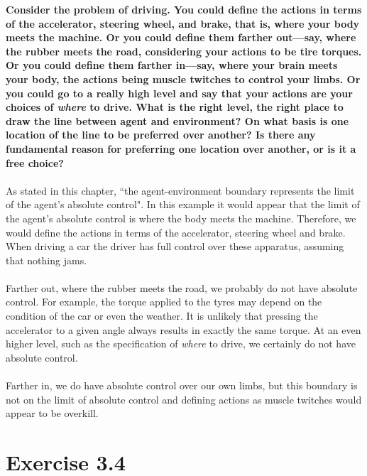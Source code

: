 \documentclass[a4paper,11pt]{article}
\numberwithin{equation}{section}
\theoremstyle{remark}
\begin{document}
\textbf{Consider the problem of driving. You could define the actions in terms of the accelerator, steering wheel, and brake, that is, where your body meets the machine. Or you could define them farther out—say, where the rubber meets the road, considering your actions to be tire torques. Or you could define them farther in—say, where your brain meets your body, the actions being muscle twitches to control your limbs. Or you could go to a really high level and say that your actions are your choices of \emph{where} to drive. What is the right level, the right place to draw the line between agent and environment? On what basis is one location of the line to be preferred over another? Is there any fundamental reason for preferring one location over another, or is it a free choice?}
\\ \\
As stated in this chapter, ``the agent-environment boundary represents the limit of the agent's absolute control". In this example it would appear that the limit of the agent's absolute control is where the body meets the machine. Therefore, we would define the actions in terms of the accelerator, steering wheel and brake. When driving a car the driver has full control over these apparatus, assuming that nothing jams. 
\\ \\
Farther out, where the rubber meets the road, we probably do not have absolute control. For example, the torque applied to the tyres may depend on the condition of the car or even the weather. It is unlikely that pressing the accelerator to a given angle always results in exactly the same torque. At an even higher level, such as the specification of \emph{where} to drive, we certainly do not have absolute control.
\\ \\
Farther in, we do have absolute control over our own limbs, but this boundary is not on the limit of absolute control and defining actions as muscle twitches would appear to be overkill. 

\newpage
\section{Exercise 3.4}
\end{document}

